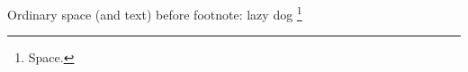 \documentclass{article}
\begin{document}
Ordinary space (and text) before footnote: lazy dog \footnote{Space.}
\end{document}
